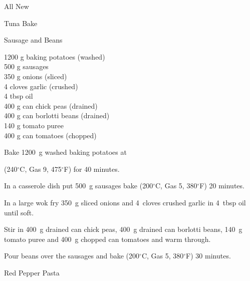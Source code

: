 \begin{menu}{All New}
\begin{recipe}{2}{Tuna Bake}
\begin{instructions}
    \end{instructions}
    \end{recipe}%
  
    \begin{recipe}{2}{Sausage and Beans}%
    
		\begin{ingredients}
		1200 g baking potatoes (washed) \\
	500 g sausages  \\
	350 g onions (sliced) \\
	4 cloves garlic (crushed) \\
	4 tbsp oil  \\
	400 g can chick peas (drained) \\
	400 g can borlotti beans (drained) \\
	140 g tomato puree  \\
	400 g can tomatoes (chopped) \\
	
		\end{ingredients}
	
    \begin{instructions}
    \item 
      Bake 1200~g washed baking potatoes
      at
      
      (240$^{\circ}$C, Gas 9, 475$^{\circ}$F)
     for 40 minutes.
    \item 
        In a casserole dish put
        500~g  sausages
        bake 
      (200$^{\circ}$C, Gas 5, 380$^{\circ}$F)
     20 minutes.
      \item 
        In a large wok fry
        350~g sliced onions
        and
        4~cloves crushed garlic
        in
        4~tbsp  oil
        until soft.
      \item 
        Stir in
        400~g drained can chick peas,
        400~g drained can borlotti beans,
        140~g  tomato puree
        and
        400~g chopped can tomatoes
        and warm through.
      \item 
        Pour beans over the sausages and bake 
      (200$^{\circ}$C, Gas 5, 380$^{\circ}$F)
     30 minutes.
      
    \end{instructions}
    \end{recipe}%
  
    \begin{recipe}{2}{Red Pepper Pasta}%
    

\end{recipe}
\end{menu}

